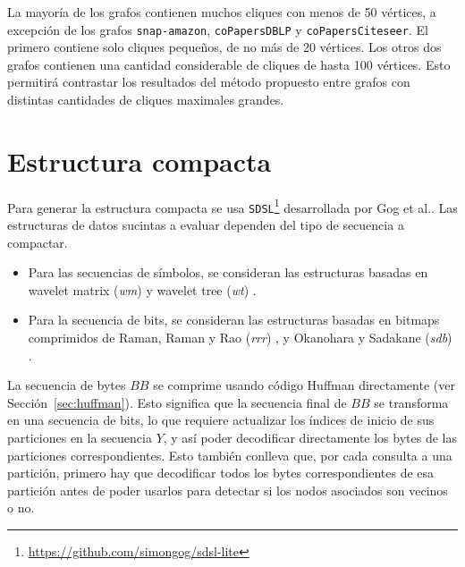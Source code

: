 La mayoría de los grafos contienen muchos cliques con menos de 50 vértices, a excepción de los grafos \texttt{snap-amazon}, \texttt{coPapersDBLP} y \texttt{coPapersCiteseer}. El primero contiene solo cliques pequeños, de no más de 20 vértices. Los otros dos grafos contienen una cantidad considerable de cliques de hasta 100 vértices. Esto permitirá contrastar los resultados del método propuesto entre grafos con distintas cantidades de cliques maximales grandes.

%


\section{Estructura compacta}

Para generar la estructura compacta se usa \texttt{SDSL}\footnote{\url{https://github.com/simongog/sdsl-lite}} desarrollada por Gog et al.\cite{gbmp2014sea}. Las estructuras de datos sucintas a evaluar dependen del tipo de secuencia a compactar.

\begin{itemize}
	\item Para las secuencias de símbolos, se consideran las estructuras basadas en wavelet matrix (\textit{wm}) \cite{claude2015wavelet} y wavelet tree (\textit{wt}) \cite{grossi2003high}.
	\item Para la secuencia de bits, se consideran las estructuras basadas en bitmaps comprimidos de Raman, Raman y Rao (\textit{rrr}) \cite{raman2002succinct}, y Okanohara y Sadakane (\textit{sdb}) \cite{DBLP:journals/corr/abs-cs-0610001}.
\end{itemize}

La secuencia de bytes $BB$ se comprime usando código Huffman\cite{huffman1952method} directamente (ver Sección~\ref{sec:huffman}). Esto significa que la secuencia final de $BB$ se transforma en una secuencia de bits, lo que requiere actualizar los índices de inicio de sus particiones en la secuencia $Y$, y así poder decodificar directamente los bytes de las particiones correspondientes. Esto también conlleva que, por cada consulta a una partición, primero hay que decodificar todos los bytes correspondientes de esa partición antes de poder usarlos para detectar si los nodos asociados son vecinos o no.


